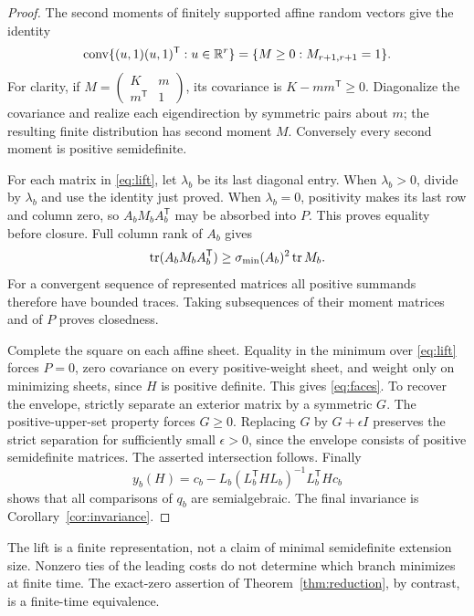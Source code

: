 \begin{proof}
The second moments of finitely supported affine random vectors give the identity
\[
 \operatorname{conv}\{(u,1)(u,1)^{\mathsf T}:u\in\mathbb R^r\}
 =\{M\ge0:M_{r+1,r+1}=1\}.
\]
For clarity, if $M=\left(\begin{smallmatrix}K&m\\m^{\mathsf T}&1\end{smallmatrix}\right)$, its covariance is $K-mm^{\mathsf T}\ge0$. Diagonalize the covariance and realize each eigendirection by symmetric pairs about $m$; the resulting finite distribution has second moment $M$. Conversely every second moment is positive semidefinite.

For each matrix in \eqref{eq:lift}, let $\lambda_b$ be its last diagonal entry. When $\lambda_b>0$, divide by $\lambda_b$ and use the identity just proved. When $\lambda_b=0$, positivity makes its last row and column zero, so $A_bM_bA_b^{\mathsf T}$ may be absorbed into $P$. This proves equality before closure. Full column rank of $A_b$ gives
\[
 \operatorname{tr}(A_bM_bA_b^{\mathsf T})\ge\sigma_{\min}(A_b)^2\operatorname{tr} M_b.
\]
For a convergent sequence of represented matrices all positive summands therefore have bounded traces. Taking subsequences of their moment matrices and of $P$ proves closedness.

Complete the square on each affine sheet. Equality in the minimum over \eqref{eq:lift} forces $P=0$, zero covariance on every positive-weight sheet, and weight only on minimizing sheets, since $H$ is positive definite. This gives \eqref{eq:faces}. To recover the envelope, strictly separate an exterior matrix by a symmetric $G$. The positive-upper-set property forces $G\ge0$. Replacing $G$ by $G+\epsilon I$ preserves the strict separation for sufficiently small $\epsilon>0$, since the envelope consists of positive semidefinite matrices. The asserted intersection follows. Finally
\[
 y_b(H)=c_b-L_b(L_b^{\mathsf T}HL_b)^{-1}L_b^{\mathsf T}Hc_b
\]
shows that all comparisons of $q_b$ are semialgebraic. The final invariance is Corollary~\ref{cor:invariance}.
\end{proof}
The lift is a finite representation, not a claim of minimal semidefinite extension size. Nonzero ties of the leading costs do not determine which branch minimizes at finite time. The exact-zero assertion of Theorem~\ref{thm:reduction}, by contrast, is a finite-time equivalence.


